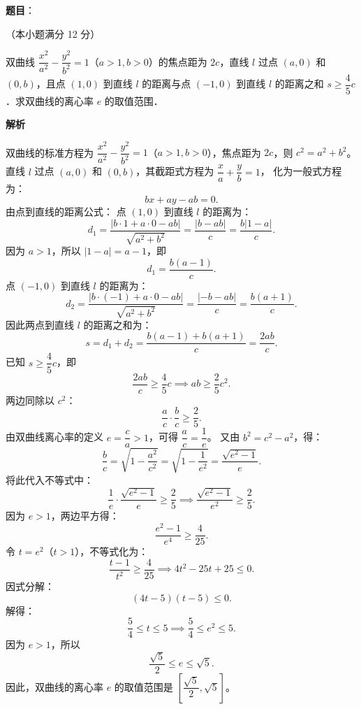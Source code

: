 \begin{answer}

\textbf{题目}：

（本小题满分 12 分）

双曲线 $\dfrac{x^2}{a^2}-\dfrac{y^2}{b^2}=1$（$a>1,b>0$）的焦点距为 $2c$，直线 $l$ 过点 $(a,0)$ 和 $(0,b)$，且点 $(1,0)$ 到直线 $l$ 的距离与点 $(-1,0)$ 到直线 $l$ 的距离之和 $s\geqslant\dfrac{4}{5}c$．求双曲线的离心率 $e$ 的取值范围．

\textbf{解析}

双曲线的标准方程为 $\dfrac{x^2}{a^2}-\dfrac{y^2}{b^2}=1$（$a>1,b>0$），焦点距为 $2c$，则 $c^2=a^2+b^2$。
直线 $l$ 过点 $(a,0)$ 和 $(0,b)$，其截距式方程为 $\dfrac{x}{a}+\dfrac{y}{b}=1$，
化为一般式方程为：
\nopagebreak[4]
\[
bx+ay-ab=0.
\]
由点到直线的距离公式：
点 $(1,0)$ 到直线 $l$ 的距离为：
\nopagebreak[4]
\[
d_1=\frac{|b\cdot 1+a\cdot 0-ab|}{\sqrt{a^2+b^2}}=\frac{|b-ab|}{c}=\frac{b|1-a|}{c}.
\]
因为 $a>1$，所以 $|1-a|=a-1$，即
\nopagebreak[4]
\[
d_1=\frac{b(a-1)}{c}.
\]
点 $(-1,0)$ 到直线 $l$ 的距离为：
\nopagebreak[4]
\[
d_2=\frac{|b\cdot(-1)+a\cdot 0-ab|}{\sqrt{a^2+b^2}}=\frac{|-b-ab|}{c}=\frac{b(a+1)}{c}.
\]
因此两点到直线 $l$ 的距离之和为：
\nopagebreak[4]
\[
s=d_1+d_2=\frac{b(a-1)+b(a+1)}{c}=\frac{2ab}{c}.
\]
已知 $s\geqslant\dfrac{4}{5}c$，即
\nopagebreak[4]
\[
\frac{2ab}{c}\geqslant\frac{4}{5}c\implies ab\geqslant\frac{2}{5}c^2.
\]
两边同除以 $c^2$：
\nopagebreak[4]
\[
\frac{a}{c}\cdot\frac{b}{c}\geqslant\frac{2}{5}.
\]
由双曲线离心率的定义 $e=\dfrac{c}{a}>1$，可得 $\dfrac{a}{c}=\dfrac{1}{e}$。
又由 $b^2=c^2-a^2$，得：
\nopagebreak[4]
\[
\frac{b}{c}=\sqrt{1-\frac{a^2}{c^2}}=\sqrt{1-\frac{1}{e^2}}=\frac{\sqrt{e^2-1}}{e}.
\]
将此代入不等式中：
\nopagebreak[4]
\[
\frac{1}{e}\cdot\frac{\sqrt{e^2-1}}{e}\geqslant\frac{2}{5}\implies\frac{\sqrt{e^2-1}}{e^2}\geqslant\frac{2}{5}.
\]
因为 $e>1$，两边平方得：
\nopagebreak[4]
\[
\frac{e^2-1}{e^4}\geqslant\frac{4}{25}.
\]
令 $t=e^2$（$t>1$），不等式化为：
\nopagebreak[4]
\[
\frac{t-1}{t^2}\geqslant\frac{4}{25}\implies 4t^2-25t+25\leqslant 0.
\]
因式分解：
\nopagebreak[4]
\[
(4t-5)(t-5)\leqslant 0.
\]
解得：
\nopagebreak[4]
\[
\frac{5}{4}\leqslant t\leqslant 5\implies\frac{5}{4}\leqslant e^2\leqslant 5.
\]
因为 $e>1$，所以
\nopagebreak[4]
\[
\frac{\sqrt{5}}{2}\leqslant e\leqslant\sqrt{5}.
\]
因此，双曲线的离心率 $e$ 的取值范围是 $\left[\dfrac{\sqrt{5}}{2},\sqrt{5}\right]$。


\end{answer}
